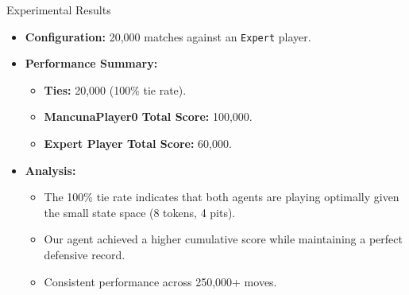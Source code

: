 \documentclass{beamer}
\begin{document}
\begin{frame}{Experimental Results}
    \begin{itemize}
        \item \textbf{Configuration:} 20,000 matches against an \texttt{Expert} player.
        \item \textbf{Performance Summary:}
        \begin{itemize}
            \item \textbf{Ties:} 20,000 (100\% tie rate).
            \item \textbf{MancunaPlayer0 Total Score:} 100,000.
            \item \textbf{Expert Player Total Score:} 60,000.
        \end{itemize}
        \item \textbf{Analysis:}
        \begin{itemize}
            \item The 100\% tie rate indicates that both agents are playing optimally given the small state space (8 tokens, 4 pits).
            \item Our agent achieved a higher cumulative score while maintaining a perfect defensive record.
            \item Consistent performance across 250,000+ moves.
        \end{itemize}
    \end{itemize}
\end{frame}
\end{document}
